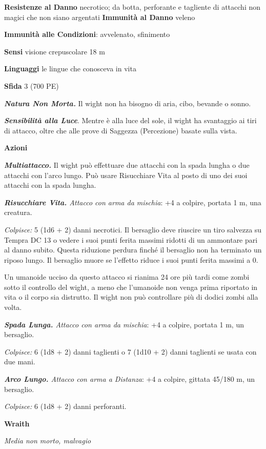 \begin{multicols}{2}
\textbf{Resistenze al Danno} necrotico; da botta, perforante e
tagliente di attacchi non magici che non siano argentati
\textbf{Immunità al Danno} veleno

\textbf{Immunità alle Condizioni}: avvelenato, sfinimento

\textbf{Sensi} visione crepuscolare 18 m

\textbf{Linguaggi} le lingue che conosceva in vita

\textbf{Sfida} 3 (700 PE)\smallskip

\emph{\textbf{Natura Non Morta.}} Il wight non ha bisogno di aria, cibo,
bevande o sonno.

\emph{\textbf{Sensibilità alla Luce}}. Mentre è alla luce del sole, il
wight ha svantaggio ai tiri di attacco, oltre che alle prove di Saggezza
(Percezione) basate sulla vista.

\smallskip\textbf{Azioni}

\emph{\textbf{Multiattacco.}} Il wight può effettuare due attacchi con
la spada lungha o due attacchi con l'arco lungo. Può usare Risucchiare
Vita al posto di uno dei suoi attacchi con la spada lungha.

\emph{\textbf{Risucchiare Vita.} Attacco con arma da mischia}: +4 a
colpire, portata 1 m, una creatura.

\emph{Colpisce:} 5 (1d6 + 2) danni necrotici. Il bersaglio deve riuscire
un tiro salvezza su Tempra DC 13 o vedere i suoi punti ferita
massimi ridotti di un ammontare pari al danno subito. Questa riduzione
perdura finché il bersaglio non ha terminato un riposo lungo. Il
bersaglio muore se l'effetto riduce i suoi punti ferita massimi a 0.

Un umanoide ucciso da questo attacco si rianima 24 ore più tardi come
zombi sotto il controllo del wight, a meno che l'umanoide non venga
prima riportato in vita o il corpo sia distrutto. Il wight non può
controllare più di dodici zombi alla volta.

\emph{\textbf{Spada Lunga.} Attacco con arma da mischia}: +4 a colpire,
portata 1 m, un bersaglio.

\emph{Colpisce:} 6 (1d8 + 2) danni taglienti o 7 (1d10 + 2) danni
taglienti se usata con due mani.

\emph{\textbf{Arco Lungo.} Attacco con arma a Distanza}: +4 a colpire,
gittata 45/180 m, un bersaglio.

\emph{Colpisce:} 6 (1d8 + 2) danni perforanti.

\textbf{Wraith}

\emph{Media non morto, malvagio}


\end{multicols}
